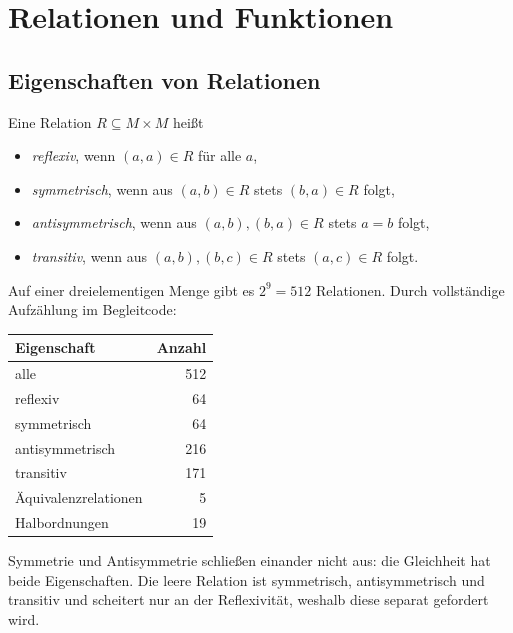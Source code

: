 \documentclass[12pt, a4paper]{article}
\begin{document}
\section{Relationen und Funktionen}

\subsection{Eigenschaften von Relationen}

\begin{definitionbox}
Eine Relation $R \subseteq M \times M$ heißt
\begin{itemize}
  \item \emph{reflexiv}, wenn $(a,a) \in R$ für alle $a$,
  \item \emph{symmetrisch}, wenn aus $(a,b) \in R$ stets $(b,a) \in R$ folgt,
  \item \emph{antisymmetrisch}, wenn aus $(a,b), (b,a) \in R$ stets $a = b$ folgt,
  \item \emph{transitiv}, wenn aus $(a,b), (b,c) \in R$ stets $(a,c) \in R$ folgt.
\end{itemize}
\end{definitionbox}

\begin{examplebox}
Auf einer dreielementigen Menge gibt es $2^9 = 512$ Relationen. Durch
vollständige Aufzählung im Begleitcode:

\begin{center}
\begin{tabular}{lr}
\toprule
Eigenschaft & Anzahl\\
\midrule
alle & 512\\
reflexiv & 64\\
symmetrisch & 64\\
antisymmetrisch & 216\\
transitiv & 171\\
Äquivalenzrelationen & 5\\
Halbordnungen & 19\\
\bottomrule
\end{tabular}
\end{center}
\end{examplebox}

\begin{notebox}
Symmetrie und Antisymmetrie schließen einander nicht aus: die Gleichheit hat
beide Eigenschaften. Die leere Relation ist symmetrisch, antisymmetrisch und
transitiv und scheitert nur an der Reflexivität, weshalb diese separat
gefordert wird.
\end{notebox}
\end{document}
